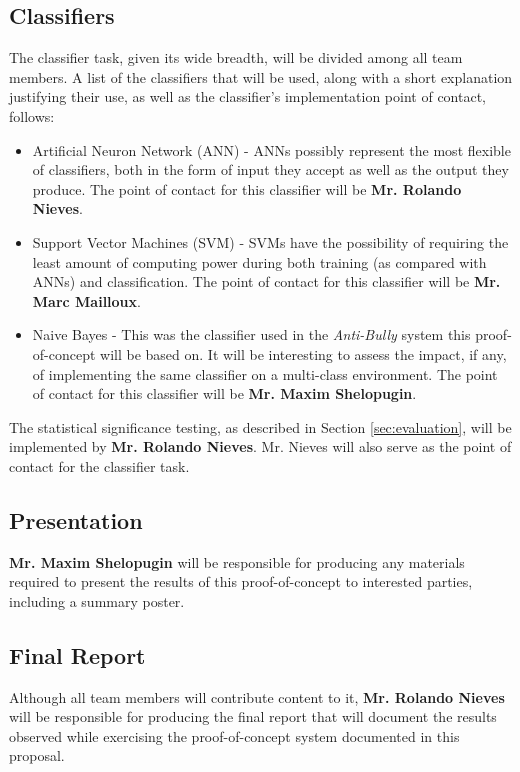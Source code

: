 \documentclass[conference]{sig-alternate-05-2015}
\begin{document}
\subsection{Classifiers}\label{sec:classifier_task}
The classifier task, given its wide breadth, will be divided among all team
members. A list of the classifiers that will be used, along with a short
explanation justifying their use, as well as the classifier's implementation
point of contact, follows:
\begin{itemize}
  \item Artificial Neuron Network (ANN) - ANNs possibly represent the most
  flexible of classifiers, both in the form of input they accept as well as the
  output they produce. The point of contact for this classifier will be
  \textbf{Mr. Rolando Nieves}.
  \item Support Vector Machines (SVM) - SVMs have the possibility of requiring
  the least amount of computing power during both training (as compared with
  ANNs) and classification. The point of contact for this classifier will be
  \textbf{Mr. Marc Mailloux}.
  \item Naive Bayes - This was the classifier used in the \textit{Anti-Bully}
  system this proof-of-concept will be based on. It will be interesting to
  assess the impact, if any, of implementing the same classifier on a
  multi-class environment. The point of contact for this classifier will be
  \textbf{Mr. Maxim Shelopugin}.
\end{itemize}

The statistical significance testing, as described in Section
\ref{sec:evaluation}, will be implemented by \textbf{Mr. Rolando Nieves}. Mr.
Nieves will also serve as the point of contact for the classifier task.

\subsection{Presentation}\label{sec:presentation_task}
\textbf{Mr. Maxim Shelopugin} will be responsible for producing any materials
required to present the results of this proof-of-concept to interested parties,
including a summary poster.

\subsection{Final Report}\label{sec:report_task}
Although all team members will contribute content to it,
\textbf{Mr. Rolando Nieves} will be responsible for producing the final report
that will document the results observed while exercising the proof-of-concept
system documented in this proposal.



\end{document}
